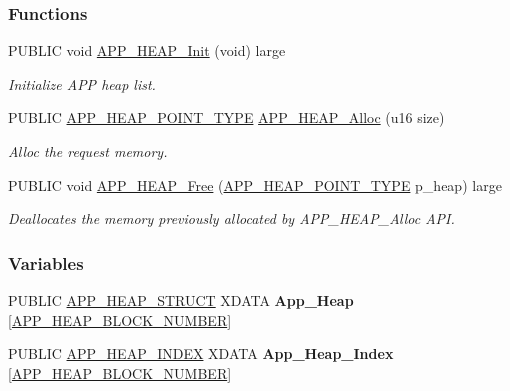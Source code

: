 \subsubsection*{Functions}
\begin{DoxyCompactItemize}
\item 
P\+U\+B\+L\+IC void \hyperlink{group___h_e_a_p_ga9c0ed7b5b0e4b2a0d21e80d861ced5f6}{A\+P\+P\+\_\+\+H\+E\+A\+P\+\_\+\+Init} (void) large\hypertarget{group___h_e_a_p_ga9c0ed7b5b0e4b2a0d21e80d861ced5f6}{}\label{group___h_e_a_p_ga9c0ed7b5b0e4b2a0d21e80d861ced5f6}

\begin{DoxyCompactList}\small\item\em Initialize A\+PP heap list. \end{DoxyCompactList}\item 
P\+U\+B\+L\+IC \hyperlink{group___h_e_a_p_gac8090ae7433e9fda501dd91e26c7f66e}{A\+P\+P\+\_\+\+H\+E\+A\+P\+\_\+\+P\+O\+I\+N\+T\+\_\+\+T\+Y\+PE} \hyperlink{group___h_e_a_p_ga741c668643d6a13d719e5a3212c05857}{A\+P\+P\+\_\+\+H\+E\+A\+P\+\_\+\+Alloc} (u16 size)
\begin{DoxyCompactList}\small\item\em Alloc the request memory. \end{DoxyCompactList}\item 
P\+U\+B\+L\+IC void \hyperlink{group___h_e_a_p_ga2b419c19b01e26ed329a24ff5854cb18}{A\+P\+P\+\_\+\+H\+E\+A\+P\+\_\+\+Free} (\hyperlink{group___h_e_a_p_gac8090ae7433e9fda501dd91e26c7f66e}{A\+P\+P\+\_\+\+H\+E\+A\+P\+\_\+\+P\+O\+I\+N\+T\+\_\+\+T\+Y\+PE} p\+\_\+heap) large
\begin{DoxyCompactList}\small\item\em Deallocates the memory previously allocated by A\+P\+P\+\_\+\+H\+E\+A\+P\+\_\+\+Alloc A\+PI. \end{DoxyCompactList}\end{DoxyCompactItemize}
\subsubsection*{Variables}
\begin{DoxyCompactItemize}
\item 
P\+U\+B\+L\+IC \hyperlink{struct_a_p_p___h_e_a_p___s_t_r_u_c_t}{A\+P\+P\+\_\+\+H\+E\+A\+P\+\_\+\+S\+T\+R\+U\+CT} X\+D\+A\+TA {\bfseries App\+\_\+\+Heap} \mbox{[}\hyperlink{group___h_e_a_p_ga16afa60a5d847e39bd31115ba7009b34}{A\+P\+P\+\_\+\+H\+E\+A\+P\+\_\+\+B\+L\+O\+C\+K\+\_\+\+N\+U\+M\+B\+ER}\mbox{]}\hypertarget{group___h_e_a_p_ga1f2af9e9a6e91a010202eab1b33afe30}{}\label{group___h_e_a_p_ga1f2af9e9a6e91a010202eab1b33afe30}

\item 
P\+U\+B\+L\+IC \hyperlink{group___h_e_a_p_gac92ab72831cd0fc218a7529be207c778}{A\+P\+P\+\_\+\+H\+E\+A\+P\+\_\+\+I\+N\+D\+EX} X\+D\+A\+TA {\bfseries App\+\_\+\+Heap\+\_\+\+Index} \mbox{[}\hyperlink{group___h_e_a_p_ga16afa60a5d847e39bd31115ba7009b34}{A\+P\+P\+\_\+\+H\+E\+A\+P\+\_\+\+B\+L\+O\+C\+K\+\_\+\+N\+U\+M\+B\+ER}\mbox{]}\hypertarget{group___h_e_a_p_ga0138d3a6567b342f230697665d740a46}{}\label{group___h_e_a_p_ga0138d3a6567b342f230697665d740a46}

\end{DoxyCompactItemize}


